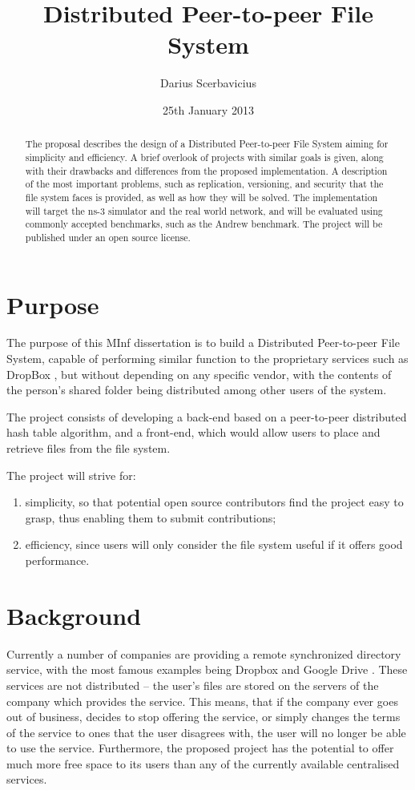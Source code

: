 \documentclass[8pt,a4paper]{article}
\title{Distributed Peer-to-peer File System}
\author{Darius Scerbavicius}
\date{25th January 2013}
\begin{document}
\maketitle

\begin{abstract}
The proposal describes the design of a Distributed Peer-to-peer File System aiming for simplicity and efficiency. A brief overlook of projects with similar goals is given, along with their drawbacks and differences from the proposed implementation. A description of the most important problems, such as replication, versioning, and security that the file system faces is provided, as well as how they will be solved. The implementation will target the ns-3 simulator and the real world network, and will be evaluated using commonly accepted benchmarks, such as the Andrew benchmark. The project will be published under an open source license.
\end{abstract}

\section{Purpose}
The purpose of this MInf dissertation is to build a Distributed Peer-to-peer File System, capable of performing similar function to the proprietary services such as DropBox \cite{dropbox}, but without depending on any specific vendor, with the contents of the person's shared folder being distributed among other users of the system. 

The project consists of developing a back-end based on a peer-to-peer distributed hash table algorithm, and a front-end, which would allow users to place and retrieve files from the file system.

The project will strive for:
\begin{enumerate}
\item simplicity, so that potential open source contributors find the project easy to grasp, thus enabling them to submit contributions;
\item efficiency, since users will only consider the file system useful if it offers good performance.
\end{enumerate}

\section{Background}

Currently a number of companies are providing a remote synchronized directory service, with the most famous examples being Dropbox \cite{dropbox} and Google Drive \cite{gdrive}. These services are not distributed -- the user's files are stored on the servers of the company which provides the service. This means, that if the company ever goes out of business, decides to stop offering the service, or simply changes the terms of the service to ones that the user disagrees with, the user will no longer be able to use the service. 
Furthermore, the proposed project has the potential to offer much more free space to its users than any of the currently available centralised services.
\end{document}
